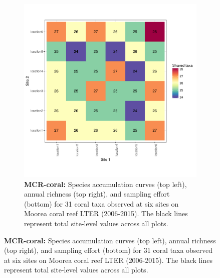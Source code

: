 \documentclass[11pt, oneside]{article}
\begin{document}
\begin{figure}[h!]
\begin{figure}[h!]
\includegraphics[scale = 0.4]{mcr-coral-castorani_spp_shared.pdf}
\caption{{\bf MCR-coral:} Species accumulation curves (top left),  annual richness (top right), and sampling effort (bottom)  for 31 coral taxa observed at six sites on Moorea coral reef LTER (2006-2015). The black lines represent total site-level values across all plots.}
\label{mcr-coral}
\end{figure}





\end{figure}
\end{document}
